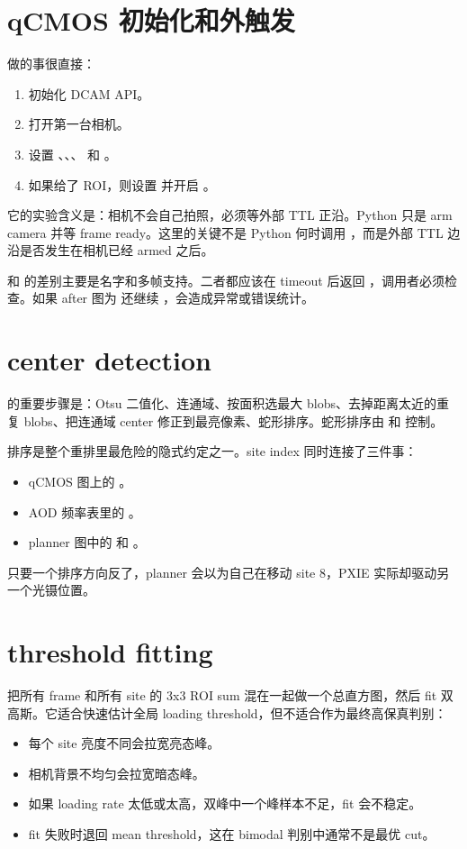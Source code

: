 \documentclass[11pt,oneside,openany]{book}
\begin{document}
\section{qCMOS 初始化和外触发}
 做的事很直接：
\begin{enumerate}
  \item {} 初始化 DCAM API。
  \item {} 打开第一台相机。
  \item 设置 、、、 和 。
  \item 如果给了 ROI，则设置  并开启 。
\end{enumerate}

它的实验含义是：相机不会自己拍照，必须等外部 TTL 正沿。Python 只是 arm camera 并等 frame ready。这里的关键不是 Python 何时调用 ，而是外部 TTL 边沿是否发生在相机已经 armed 之后。

 和  的差别主要是名字和多帧支持。二者都应该在 timeout 后返回 ，调用者必须检查。如果 after 图为  还继续 ，会造成异常或错误统计。

\section{center detection}
 的重要步骤是：Otsu 二值化、连通域、按面积选最大 blobs、去掉距离太近的重复 blobs、把连通域 center 修正到最亮像素、蛇形排序。蛇形排序由  和  控制。

排序是整个重排里最危险的隐式约定之一。site index 同时连接了三件事：
\begin{itemize}
  \item qCMOS 图上的 。
  \item AOD 频率表里的 。
  \item planner 图中的  和 。
\end{itemize}
只要一个排序方向反了，planner 会以为自己在移动 site 8，PXIE 实际却驱动另一个光镊位置。

\section{threshold fitting}
 把所有 frame 和所有 site 的 3x3 ROI sum 混在一起做一个总直方图，然后 fit 双高斯。它适合快速估计全局 loading threshold，但不适合作为最终高保真判别：
\begin{itemize}
  \item 每个 site 亮度不同会拉宽亮态峰。
  \item 相机背景不均匀会拉宽暗态峰。
  \item 如果 loading rate 太低或太高，双峰中一个峰样本不足，fit 会不稳定。
  \item fit 失败时退回 mean threshold，这在 bimodal 判别中通常不是最优 cut。
\end{itemize}
\end{document}

